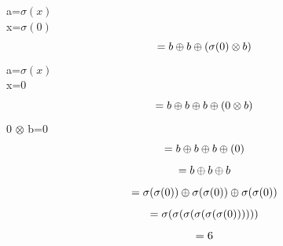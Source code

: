 \documentclass{article}
\begin{document}
\begin{itemize}
\[\]
        a=$\sigma(x)$\\
        x=$\sigma(0)$
\[
       =b\oplus b\oplus(\sigma(0)\otimes b)\\
\]
        a=$\sigma(x)$\\
        x=0
\[
       =b\oplus b\oplus b\oplus(0\otimes b)\\
\]
 0 $\otimes$ b=0
\[
       =b\oplus b\oplus b\oplus(0)\\
\]
\[
       =b\oplus b\oplus b\\
\]
\[
       =\sigma(\sigma(0))\oplus \sigma(\sigma(0))\oplus \sigma(\sigma(0))\\
\]
\[
       =\sigma( \sigma( \sigma(\sigma( \sigma( \sigma(0))))))\\
\]
\[
       =6\\
\]
\end{itemize}
\end{document}

